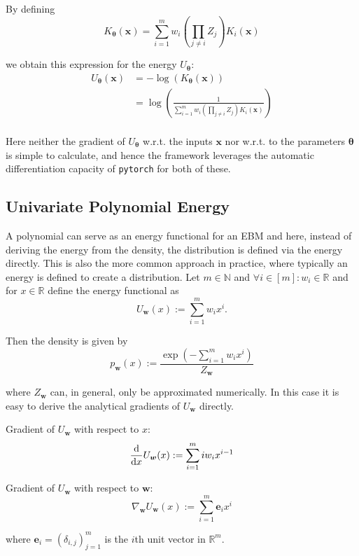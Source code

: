 By defining 
\[
	K_{\bm{\theta}} (\bm{x}) = \sum_{i = 1}^m w_i (\prod_{j \neq i} Z_j ) K_i(\bm{x})
\]

we obtain this expression for the energy $U_{\bm{\theta}}$:
\[
\begin{aligned}
	U_{\bm{\theta}} (\bm{x}) 
	&= - \log(K_{\bm{\theta}} (\bm{x}) )  \\
	&= \log( \frac{ 1 }{ \sum_{i = 1}^m w_i (\prod_{j \neq i} Z_j ) K_i(\bm{x})} )\\
\end{aligned}
\]

Here neither the gradient of $U_{\bm{\theta}}$ w.r.t. the inputs $\bm{x}$ nor w.r.t. to the parameters $\bm{\theta}$ is simple to calculate,
and hence the framework leverages the automatic differentiation capacity of \texttt{pytorch} for both of these.


\subsection{Univariate Polynomial Energy}

A polynomial can serve as an energy functional for an EBM and here, instead of deriving the energy from the density, the distribution is defined via the energy directly.
This is also the more common approach in practice, where typically an energy is defined to create a distribution.
Let $m \in \mathbb{N}$ and $\forall i \in [m]: w_i \in \mathbb{R}$ and for $x \in \mathbb{R}$ define the energy functional as
\[
	U_{\bm{w}} (x) := \sum_{i = 1}^m w_i x^i .
\]

Then the density is given by
\[
	p_{\bm{w}} (x) := \frac{ \exp( - \sum_{i = 1}^m w_i x^i ) }{ Z_{\bm{w}} }
\]

where $Z_{\bm{w}}$ can, in general, only be approximated numerically.
In this case it is easy to derive the analytical gradients of $U_{\bm{w}}$ directly.

Gradient of $U_{\bm{w}}$ with respect to $x$:
\[
	\frac{ \mathop{}\!\mathrm{d} }{ \mathop{}\!\mathrm{d} x} U_{\bm{w}} (x) := \sum_{i = 1}^{m} i w_i x^{i -1}
\]

Gradient of $U_{\bm{w}}$ with respect to $\bm{w}$:
\[
	\nabla_{\bm{w}} U_{\bm{w}} (x) := \sum_{i = 1}^{m} \bm{e}_i x^i
\]

where $\bm{e}_i = (\delta_{i, j})_{j=1}^m$ is the $i$th unit vector in $\mathbb{R}^m$.









